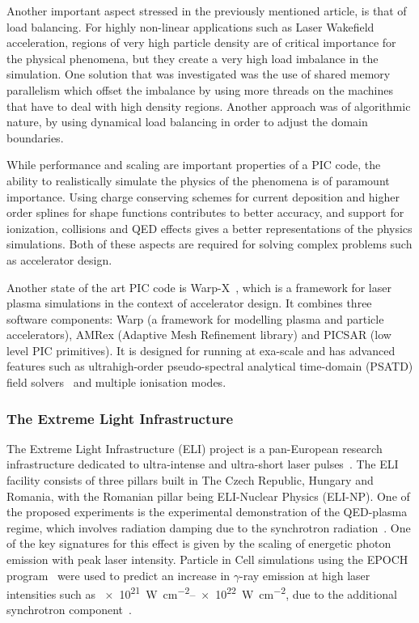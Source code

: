 \documentclass[12pt, class=report, crop=false]{standalone}
\begin{document}
Another important aspect stressed in the previously mentioned article, is that
of load balancing. For highly non-linear applications such as Laser Wakefield
acceleration, regions of very high particle density are of critical importance
for the physical phenomena, but they create a very high load imbalance in the
simulation. One solution that was investigated was the use of shared memory
parallelism which offset the imbalance by using more threads on the machines
that have to deal with high density regions. Another approach was of algorithmic
nature, by using dynamical load balancing in order to adjust the domain boundaries.

While performance and scaling are important properties of a PIC code, the ability
to realistically simulate the physics of the phenomena is of paramount importance.
Using charge conserving schemes for current deposition and higher order splines
for shape functions contributes to better accuracy, and support for ionization,
collisions and QED effects gives a better representations of the physics simulations.
Both of these aspects are required for solving complex problems such as accelerator
design.

Another state of the art PIC code is Warp-X~\autocite{vay_warpxnew_2018}, which
is a framework for laser plasma simulations in the context of accelerator design.
It combines three software components: Warp (a framework for modelling plasma and
particle accelerators), AMRex (Adaptive Mesh Refinement library) and
PICSAR (low level PIC primitives). It is designed for running at exa-scale
and has advanced features such as ultrahigh-order pseudo-spectral analytical
time-domain (PSATD) field solvers~\autocite{vincenti_ultrahighordermaxwell_2018}
and multiple ionisation modes.

\subsubsection{The Extreme Light Infrastructure}

The Extreme Light Infrastructure (ELI) project is a pan-European research
infrastructure dedicated to ultra-intense and ultra-short laser
pulses~\autocite{gales_introduction_2016}. The ELI facility consists of three
pillars built in The Czech Republic, Hungary and Romania, with the Romanian
pillar being ELI-Nuclear Physics (ELI-NP). One of the proposed experiments is the
experimental demonstration of the QED-plasma regime, which involves radiation
damping due to the synchrotron radiation~\autocite{turcu_highfield_2016}.
One of the key signatures for this effect is given by the scaling of energetic
photon emission with peak laser intensity. Particle in Cell simulations
using the EPOCH program~\autocite{arber_contemporaryparticleincell_2015} were used
to predict an increase in \(\gamma\)-ray emission at high laser intensities such as
\SIrange[range-phrase=--,range-units=single]{e21}{e22}{\watt\per\square\centi\metre},
due to the additional synchrotron component~\autocite{brady_synchrotronradiation_2014}.
\end{document}
